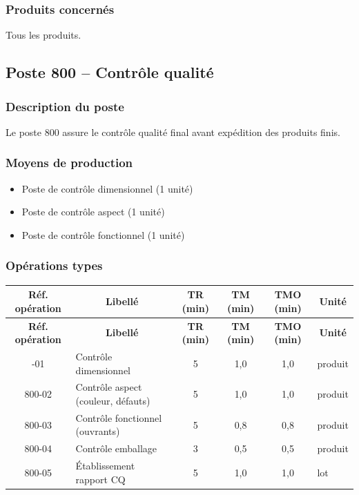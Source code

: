 \documentclass[12pt,a4paper]{article}
\begin{document}
\subsubsection{Produits concernés}
Tous les produits.

\subsection{Poste 800 – Contrôle qualité}

\subsubsection{Description du poste}
Le poste 800 assure le contrôle qualité final avant expédition des produits finis.

\subsubsection{Moyens de production}
\begin{itemize}
    \item Poste de contrôle dimensionnel (1 unité)
    \item Poste de contrôle aspect (1 unité)
    \item Poste de contrôle fonctionnel (1 unité)
\end{itemize}

\subsubsection{Opérations types}

\begin{longtable}{|c|p{5cm}|c|c|c|p{3cm}|}
\hline
\multicolumn{1}{|c|}{\textbf{Réf. opération}} & \multicolumn{1}{c|}{\textbf{Libellé}} & \multicolumn{1}{c|}{\textbf{TR (min)}} & \multicolumn{1}{c|}{\textbf{TM (min)}} & \multicolumn{1}{c|}{\textbf{TMO (min)}} & \multicolumn{1}{c|}{\textbf{Unité}} \\
\hline
\endfirsthead
\hline
\multicolumn{1}{|c|}{\textbf{Réf. opération}} & \multicolumn{1}{c|}{\textbf{Libellé}} & \multicolumn{1}{c|}{\textbf{TR (min)}} & \multicolumn{1}{c|}{\textbf{TM (min)}} & \multicolumn{1}{c|}{\textbf{TMO (min)}} & \multicolumn{1}{c|}{\textbf{Unité}} \\
\hline
\endhead
\hline
\endfoot
800-01 & Contrôle dimensionnel & 5 & 1,0 & 1,0 & produit \\
800-02 & Contrôle aspect (couleur, défauts) & 5 & 1,0 & 1,0 & produit \\
800-03 & Contrôle fonctionnel (ouvrants) & 5 & 0,8 & 0,8 & produit \\
800-04 & Contrôle emballage & 3 & 0,5 & 0,5 & produit \\
800-05 & Établissement rapport CQ & 5 & 1,0 & 1,0 & lot \\
\hline
\end{longtable}
\end{document}

